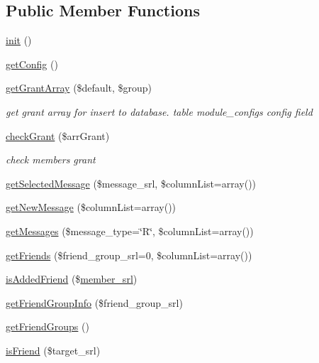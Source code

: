 \subsection*{Public Member Functions}
\begin{DoxyCompactItemize}
\item 
\hyperlink{classcommunicationModel_adff18c028fa89afeb6d7898fde5e2f91}{init} ()
\item 
\hyperlink{classcommunicationModel_ac19b1522d651d098b2d1a6f449a7b340}{get\+Config} ()
\item 
\hyperlink{classcommunicationModel_ac6a10f54e04888eed46f8fdd47b0d872}{get\+Grant\+Array} (\$default, \$group)
\begin{DoxyCompactList}\small\item\em get grant array for insert to database. table module\+\_\+config\textquotesingle{}s config field \end{DoxyCompactList}\item 
\hyperlink{classcommunicationModel_ab4bd61605c27b1777d6322321dd3e421}{check\+Grant} (\$arr\+Grant)
\begin{DoxyCompactList}\small\item\em check member\textquotesingle{}s grant \end{DoxyCompactList}\item 
\hyperlink{classcommunicationModel_a0224512523716ab204f6b91bea82aee4}{get\+Selected\+Message} (\$message\+\_\+srl, \$column\+List=array())
\item 
\hyperlink{classcommunicationModel_a2cc43556cb87f844b82814c2f49000bc}{get\+New\+Message} (\$column\+List=array())
\item 
\hyperlink{classcommunicationModel_ad742daa2376c03b70c5bf6389b10bfe7}{get\+Messages} (\$message\+\_\+type=\char`\"{}R\char`\"{}, \$column\+List=array())
\item 
\hyperlink{classcommunicationModel_a60f69cea7946be0bf4e874f2a5ab2c23}{get\+Friends} (\$friend\+\_\+group\+\_\+srl=0, \$column\+List=array())
\item 
\hyperlink{classcommunicationModel_a47441e7b20018de3fc6ab52bfb9b0d73}{is\+Added\+Friend} (\$\hyperlink{ko_8install_8php_aa61f9e08f0fe505094d26f8143f30bbd}{member\+\_\+srl})
\item 
\hyperlink{classcommunicationModel_a4ccd810d8c48ef4856da8fe986beb60a}{get\+Friend\+Group\+Info} (\$friend\+\_\+group\+\_\+srl)
\item 
\hyperlink{classcommunicationModel_a670b024aba464aee04e81fd2ae846fc5}{get\+Friend\+Groups} ()
\item 
\hyperlink{classcommunicationModel_a4e291316d5021ded0725169ada2a5dda}{is\+Friend} (\$target\+\_\+srl)
\end{DoxyCompactItemize}
